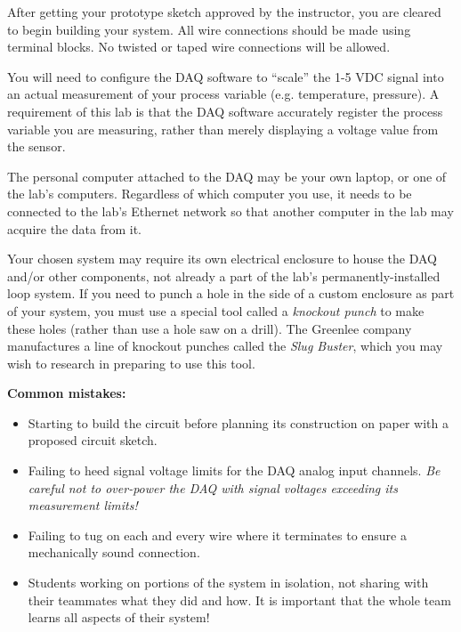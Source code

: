 \begin{itemize}
After getting your prototype sketch approved by the instructor, you are cleared to begin building your system.  All wire connections should be made using terminal blocks.  No twisted or taped wire connections will be allowed.

\vskip 10pt

You will need to configure the DAQ software to ``scale'' the 1-5 VDC signal into an actual measurement of your process variable (e.g. temperature, pressure).  A requirement of this lab is that the DAQ software accurately register the process variable you are measuring, rather than merely displaying a voltage value from the sensor.

\vskip 10pt

The personal computer attached to the DAQ may be your own laptop, or one of the lab's computers.  Regardless of which computer you use, it needs to be connected to the lab's Ethernet network so that another computer in the lab may acquire the data from it.

\vskip 10pt

Your chosen system may require its own electrical enclosure to house the DAQ and/or other components, not already a part of the lab's permanently-installed loop system.  If you need to punch a hole in the side of a custom enclosure as part of your system, you must use a special tool called a {\it knockout punch} to make these holes (rather than use a hole saw on a drill).  The Greenlee company manufactures a line of knockout punches called the {\it Slug Buster}, which you may wish to research in preparing to use this tool.

\vskip 10pt

{\bf Common mistakes:}

\begin{itemize}
\item{} Starting to build the circuit before planning its construction on paper with a proposed circuit sketch.
\item{} Failing to heed signal voltage limits for the DAQ analog input channels.  {\it Be careful not to over-power the DAQ with signal voltages exceeding its measurement limits!}
\item{} Failing to tug on each and every wire where it terminates to ensure a mechanically sound connection.
\item{} Students working on portions of the system in isolation, not sharing with their teammates what they did and how.  It is important that the whole team learns all aspects of their system!
\end{itemize}


\end{itemize}
